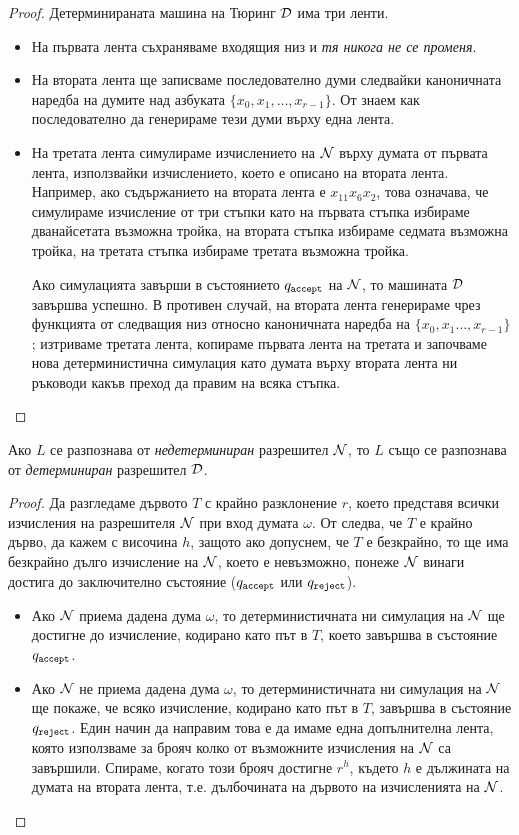 \begin{proof}
  Детерминираната машина на Тюринг $\mathcal{D}$ има три ленти.
  \begin{itemize}
  \item 
    На първата лента съхраняваме входящия низ и {\em тя никога не се променя}.
  \item
    На втората лента ще записваме последователно думи следвайки каноничната наредба на 
    думите над азбуката $\{x_0,x_1,\dots,x_{r-1}\}$.
    От  знаем как последователно да генерираме тези думи върху една лента.
  \item
    На третата лента симулираме изчислението на $\mathcal{N}$ върху думата от първата лента, използвайки изчислението, 
    което е описано на втората лента. Например, ако съдържанието на втората лента е $x_{11}x_6x_2$,
    това означава, че симулираме изчисление от три стъпки като на първата стъпка избираме дванайсетата
    възможна тройка, на втората стъпка избираме седмата възможна тройка, на третата стъпка избираме третата възможна тройка.
    
    Ако симулацията завърши в състоянието $q_{\texttt{accept}}$ на $\mathcal{N}$, то машината $\mathcal{D}$ завършва успешно.
    В противен случай, на втората лента генерираме чрез функцията от  следващия низ относно каноничната наредба на $\{x_0,x_1\dots,x_{r-1}\}$;
    изтриваме третата лента, копираме първата лента на третата и започваме нова детерминистична симулация като думата върху втората лента ни ръководи какъв преход да правим на всяка стъпка.
  \end{itemize}
\end{proof}


\begin{corollary}
  Ако $L$ се разпознава от {\em недетерминиран} разрешител $\mathcal{N}$, то $L$
  също се разпознава от {\em детерминиран} разрешител $\mathcal{D}$.
\end{corollary}
\begin{proof}
  Да разгледаме дървото $T$ с крайно разклонение $r$, което представя всички изчисления на разрешителя $\mathcal{N}$ при вход думата $\omega$.
  От  следва, че $T$ е крайно дърво, да кажем с височина $h$, защото ако допуснем, че $T$ е безкрайно, то ще има безкрайно дълго изчисление на $\mathcal{N}$,
  което е невъзможно, понеже $\mathcal{N}$ винаги достига до заключително състояние ($q_{\texttt{accept}}$ или $q_{\texttt{reject}}$).
  \begin{itemize}
  \item 
    Ако $\mathcal{N}$ приема дадена дума $\omega$, то детерминистичната ни симулация на $\mathcal{N}$ ще достигне до изчисление, кодирано като път в $T$, 
    което завършва в състояние $q_{\texttt{accept}}$.
  \item
    Ако $\mathcal{N}$ не приема дадена дума $\omega$, то детерминистичната ни симулация на $\mathcal{N}$ ще покаже, че всяко изчисление, кодирано като път в $T$, завършва в състояние $q_{\texttt{reject}}$.
    Един начин да направим това е да имаме една допълнителна лента, която използваме за брояч колко от възможните изчисления на $\mathcal{N}$ са завършили.
    Спираме, когато този брояч достигне $r^h$, където $h$ е дължината на думата на втората лента, т.е. дълбочината на дървото на изчисленията на $\mathcal{N}$.
  \end{itemize}
\end{proof}


